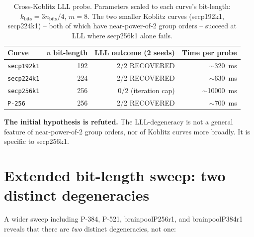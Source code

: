\documentclass[10pt,a4paper]{article}
\begin{document}
\begin{table}[h]
\centering
\begin{tabular}{lrrr}
\toprule
Curve         & $n$ bit-length & LLL outcome (2 seeds) & Time per probe \\
\midrule
\texttt{secp192k1}  &   192 & 2/2 RECOVERED          & $\sim$320~ms   \\
\texttt{secp224k1}  &   224 & 2/2 RECOVERED          & $\sim$630~ms   \\
\texttt{secp256k1}  &   256 & 0/2 (iteration cap)    & $\sim$10000~ms \\
\texttt{P-256}      &   256 & 2/2 RECOVERED          & $\sim$700~ms   \\
\bottomrule
\end{tabular}
\caption{Cross-Koblitz LLL probe. Parameters scaled to each curve's
bit-length: $k_{\text{bits}} = 3 n_{\text{bits}}/4$, $m = 8$. The
two smaller Koblitz curves (secp192k1, secp224k1) -- both of which
have near-power-of-2 group orders -- succeed at LLL where
secp256k1 alone fails.}
\label{tab:koblitz-probe}
\end{table}

\textbf{The initial hypothesis is refuted.} The LLL-degeneracy is
not a general feature of near-power-of-2 group orders, nor of
Koblitz curves more broadly. It is specific to secp256k1.

\section{Extended bit-length sweep: two distinct degeneracies}

A wider sweep including P-384, P-521, brainpoolP256r1, and
brainpoolP384r1 reveals that there are \emph{two} distinct
degeneracies, not one:
\end{document}
